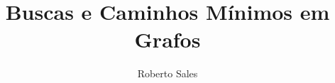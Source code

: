 \documentclass{beamer}
\begin{document}
\title{Buscas e Caminhos Mínimos em Grafos}
\subtitle{}
\author{Roberto Sales}
\date{}
\maketitle


\end{document}
